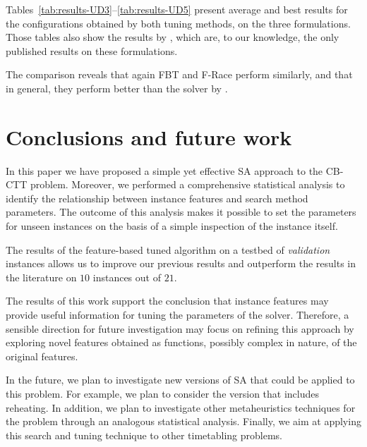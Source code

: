 \documentclass[authoryear,12pt]{article}
\newcommand{\cbctt}{CB-CTT}
\begin{document}
Tables~\ref{tab:results-UD3}--\ref{tab:results-UD5} present average and best
results for the configurations obtained by both tuning methods, on the three
formulations.  Those tables also show the results by \citet{MSTIS13}, which are,
to our knowledge, the only published results on these formulations.

The comparison reveals that again FBT and F-Race perform similarly, and
that in general, they perform better than the solver by \citet{MSTIS13}.


\section{Conclusions and future work}

In this paper we have proposed a simple yet effective SA approach to the
\cbctt{} problem.
%
Moreover, we performed a comprehensive statistical analysis to identify the
relationship between instance features and search method parameters. The
outcome of this analysis makes it possible to set the parameters for unseen
instances on the basis of a simple inspection of the instance itself.

The results of the feature-based tuned algorithm on a testbed of
\emph{validation} instances allows us to improve our previous results
\citep{BeDS12} and outperform the results in the literature on $10$ instances
out of $21$.

The results of this work support the conclusion that instance features may
provide useful information for tuning the parameters of the solver. Therefore, a
sensible direction for future investigation may focus on refining this approach
by exploring novel features obtained as functions, possibly complex in nature,
of the original features.

In the future, we plan to investigate new versions of SA that could be applied
to this problem. For example, we plan to consider the version that includes
reheating.  In addition, we plan to investigate other metaheuristics techniques
for the problem through an analogous statistical analysis.  Finally, we aim at
applying this search and tuning technique to other timetabling problems.
\end{document}
